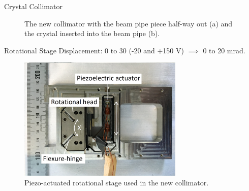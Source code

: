 \documentclass[10pt]{beamer}
\begin{document}
\begin{frame}[fragile]{Crystal Collimator}
  \begin{figure}[h!]
    \centering %
    \qquad
    \caption{\label{fig:collimator-t} The new collimator with the beam pipe piece half-way out (a) and the crystal inserted into the beam pipe (b).}
  \end{figure}
\end{frame}

\begin{frame}{Rotational Stage}
   Displacement: 0 to \unit{30}{\micro\meter} (-20 and +150 V) $\implies$ 0 to 20 mrad.
  \begin{figure}[h]
    \centering
    \includegraphics[width=0.7\textwidth]{../fig/rotational-stage.jpg}
    \caption{\label{fig:rotationalstage} Piezo-actuated rotational stage used in the new collimator.}
  \end{figure}
\end{frame}
\end{document}
